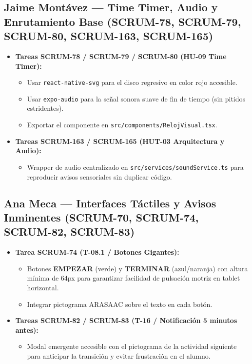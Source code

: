 \documentclass[10.5pt,a4paper]{article}
\begin{document}
\subsection{Jaime Montávez --- Time Timer, Audio y Enrutamiento Base (SCRUM-78, SCRUM-79, SCRUM-80, SCRUM-163, SCRUM-165)}
\begin{itemize}[leftmargin=*,itemsep=2pt]
    \item \textbf{Tareas SCRUM-78 / SCRUM-79 / SCRUM-80 (HU-09 Time Timer):}
    \begin{itemize}[leftmargin=*]
        \item Usar \texttt{react-native-svg} para el disco regresivo en color rojo accesible.
        \item Usar \texttt{expo-audio} para la señal sonora suave de fin de tiempo (sin pitidos estridentes).
        \item Exportar el componente en \texttt{src/components/RelojVisual.tsx}.
    \end{itemize}
    \item \textbf{Tareas SCRUM-163 / SCRUM-165 (HUT-03 Arquitectura y Audio):} 
    \begin{itemize}[leftmargin=*]
        \item Wrapper de audio centralizado en \texttt{src/services/soundService.ts} para reproducir avisos sensoriales sin duplicar código.
    \end{itemize}
\end{itemize}

\subsection{Ana Meca --- Interfaces Táctiles y Avisos Inminentes (SCRUM-70, SCRUM-74, SCRUM-82, SCRUM-83)}
\begin{itemize}[leftmargin=*,itemsep=2pt]
    \item \textbf{Tarea SCRUM-74 (T-08.1 / Botones Gigantes):}
    \begin{itemize}[leftmargin=*]
        \item Botones \textbf{EMPEZAR} (verde) y \textbf{TERMINAR} (azul/naranja) con altura mínima de 64px para garantizar facilidad de pulsación motriz en tablet horizontal.
        \item Integrar pictograma ARASAAC sobre el texto en cada botón.
    \end{itemize}
    \item \textbf{Tareas SCRUM-82 / SCRUM-83 (T-16 / Notificación 5 minutos antes):}
    \begin{itemize}[leftmargin=*]
        \item Modal emergente accesible con el pictograma de la actividad siguiente para anticipar la transición y evitar frustración en el alumno.
    \end{itemize}
\end{itemize}
\end{document}
